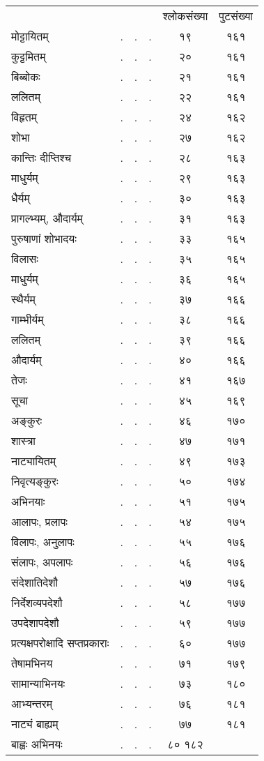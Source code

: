 \documentclass[11pt, openany]{book}
\begin{document}
\newpage

\begin{center}
\begin{tabular}{m{10em} m{2em} m{2em} m{2em} c c}
& & & & श्लोकसंख्या & पुटसंख्या\\
मोट्टायितम्& .& .& .&१९ &१६१\\
कुट्टमितम्& .& .& .&२० &१६१\\
बिब्बोकः& .& .& .&२१ &१६१\\
ललितम्& .& .& .&२२ &१६१\\
विहृतम्& .& .& .&२४ &१६२\\
शोभा& .& .& .&२७ &१६२\\
कान्तिः दीप्तिश्च& .& .& .&२८ &१६३\\
माधुर्यम्& .& .& .&२९ &१६३\\
धैर्यम्& .& .& .&३० &१६३\\
प्रागल्भ्यम्, औदार्यम्& .& .& .&३१ &१६३\\
पुरुषाणां शोभादयः& .& .& .&३३ &१६५\\
विलासः& .& .& .&३५ &१६५\\
माधुर्यम्& .& .& .&३६ &१६५\\
स्थैर्यम्& .& .& .&३७ &१६६\\
गाम्भीर्यम्& .& .& .&३८ &१६६\\
ललितम्& .& .& .&३९& १६६\\
औदार्यम्& .& .& .&४० &१६६\\
तेजः& .& .& .&४१& १६७\\
सूचा& .& .& .&४५ &१६९\\
अङ्कुरः& .& .& .&४६ &१७०\\
शास्त्रा& .& .& .&४७ &१७१\\
नाट्यायितम्& .& .& .&४९ &१७३\\
निवृत्यङ्कुरः& .& .& .&५० &१७४\\
अभिनयाः& .& .& .&५१ &१७५\\
आलापः, प्रलापः& .& .& .&५४ &१७५\\
विलापः, अनुलापः& .& .& .&५५& १७६\\
संलापः, अपलापः& .& .& .&५६ &१७६\\
संदेशातिदेशौ& .& .& .&५७ &१७६\\
निर्देशव्यपदेशौ& .& .& .&५८& १७७\\
उपदेशापदेशौ& .& .& .&५९ &१७७\\
प्रत्यक्षपरोक्षादि सप्तप्रकाराः& .& .& .&६०& १७७\\
तेषामभिनय& .& .& .&७१ &१७९\\
सामान्याभिनयः& .& .& .&७३& १८०\\
आभ्यन्तरम्& .& .& .&७६& १८१\\
नाट्यं बाह्यम्& .& .& .&७७& १८१\\
बाह्वः अभिनयः& .& .& .&८० १८२
\end{tabular}
\end{center}
\end{document}
